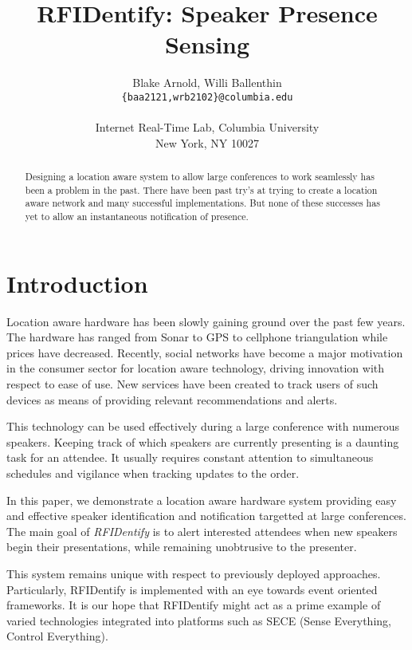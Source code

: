 \documentclass{article}
\title{RFIDentify: Speaker Presence Sensing}
\author{Blake Arnold, Willi Ballenthin\\
	\texttt{\{baa2121,wrb2102\}@columbia.edu}\\
	\\
	Internet Real-Time Lab, Columbia University\\
	New York, NY 10027\\
	}
\begin{document}
\makecover
\maketitle

\begin{abstract}
	
	Designing a location aware system to allow large conferences to work seamlessly has been a problem in the past. There have been
	 past try's at trying to create a location aware network and many successful implementations. But none of these successes has yet to allow an instantaneous notification of presence.

\end{abstract}


\section{Introduction} 
	
	Location aware hardware has been slowly gaining ground over the past few years. The hardware 
	has ranged from Sonar to GPS to cellphone triangulation while prices have decreased.  
        Recently, social networks have become a major motivation in the consumer sector for location
        aware technology, driving innovation with respect to ease of use.
        New services have been created to track users of such devices as means of providing relevant
        recommendations and alerts.

	This technology can be used effectively during a large conference with numerous speakers.
	Keeping track of which speakers are currently presenting is a daunting task for an attendee. 
        It usually requires constant attention to simultaneous schedules and vigilance when tracking
        updates to the order.

	In this paper, we demonstrate a location aware hardware system providing easy and effective 
        speaker identification and notification targetted at large conferences.
        The main goal of \textit{RFIDentify} is to alert interested  
	attendees when new speakers begin their presentations, while remaining unobtrusive to the 
        presenter.

        This system remains unique with respect to previously deployed approaches.  Particularly,
        RFIDentify is implemented with an eye towards event oriented frameworks.  It is our hope
        that RFIDentify might act as a prime example of varied technologies integrated into platforms
        such as SECE (Sense Everything, Control Everything).
\end{document}
